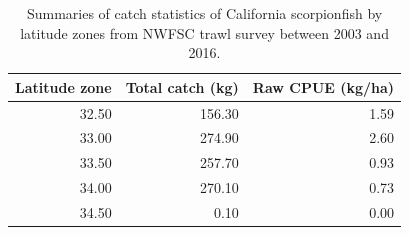 \documentclass[12pt,]{article}
\begin{document}
\begin{table}[ht]
\centering
\caption{Summaries of catch statistics of 
                                          California scorpionfish by latitude zones 
                                          from NWFSC trawl survey between 2003 and 2016.} 
\label{tab:Fleet8_NWFSCTrawl_catchlat}
\begin{tabular}{rrr}
  \hline
Latitude zone & Total catch (kg) & Raw CPUE (kg/ha) \\ 
  \hline
32.50 & 156.30 & 1.59 \\ 
  33.00 & 274.90 & 2.60 \\ 
  33.50 & 257.70 & 0.93 \\ 
  34.00 & 270.10 & 0.73 \\ 
  34.50 & 0.10 & 0.00 \\ 
   \hline
\end{tabular}
\end{table}
\end{document}
